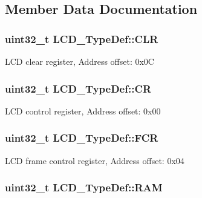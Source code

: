 \subsection{Member Data Documentation}
\hypertarget{struct_l_c_d___type_def_a426998a4ef847067fbc78606e2464e4b}{
\subsubsection[{C\-L\-R}]{ uint32\-\_\-t L\-C\-D\-\_\-\-Type\-Def\-::\-C\-L\-R}}\label{struct_l_c_d___type_def_a426998a4ef847067fbc78606e2464e4b}
L\-C\-D clear register, Address offset\-: 0x0\-C \hypertarget{struct_l_c_d___type_def_a10f3d5e534f8a6f59a2dcf9d897fba22}{
\subsubsection[{C\-R}]{ uint32\-\_\-t L\-C\-D\-\_\-\-Type\-Def\-::\-C\-R}}\label{struct_l_c_d___type_def_a10f3d5e534f8a6f59a2dcf9d897fba22}
L\-C\-D control register, Address offset\-: 0x00 \hypertarget{struct_l_c_d___type_def_a3caccc4b0b894d7b27ed5a4d508154ea}{
\subsubsection[{F\-C\-R}]{ uint32\-\_\-t L\-C\-D\-\_\-\-Type\-Def\-::\-F\-C\-R}}\label{struct_l_c_d___type_def_a3caccc4b0b894d7b27ed5a4d508154ea}
L\-C\-D frame control register, Address offset\-: 0x04 \hypertarget{struct_l_c_d___type_def_acbaed6a4bbcb966ba474d562bb652e57}{
\subsubsection[{R\-A\-M}]{ uint32\-\_\-t L\-C\-D\-\_\-\-Type\-Def\-::\-R\-A\-M}}\label{struct_l_c_d___type_def_acbaed6a4bbcb966ba474d562bb652e57}
